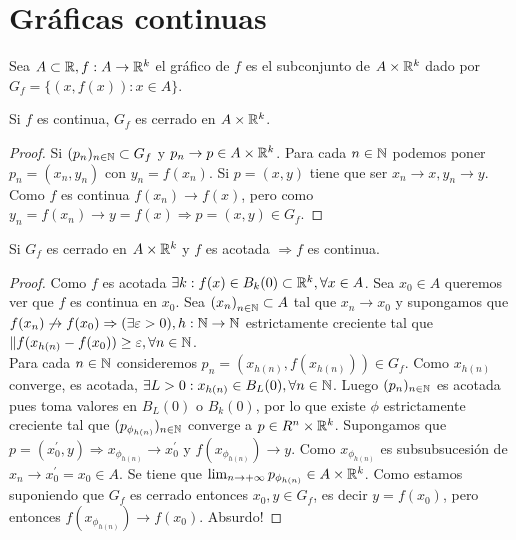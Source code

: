 \section{Gráficas continuas}

\begin{definition}
  Sea \(A \subset \mathbb{R}, f: A \to \mathbb{R}^k\) el gráfico de \(f\) es el subconjunto de \(A \times \mathbb{R}^k\) dado por \(G_f = \{ (x, f(x)) : x \in A \} \).
\end{definition}

\begin{prop}
  Si \(f\) es continua, \(G_f\) es cerrado en \(A \times \mathbb{R}^k\).
  \begin{proof}
    Si \((p_n)_{n \in \mathbb{N}} \subset G_f\) y \(p_n \to p \in A \times \mathbb{R}^k\). Para cada \(n \in \mathbb{N} \) podemos poner \(p_n = (x_n, y_n)\) con \(y_n = f(x_n)\). Si \(p = (x, y)\) tiene que ser \(x_n \to x, y_n \to y\). Como \(f\) es continua \(f(x_n) \to f(x)\), pero como \(y_n = f(x_n) \to y = f(x) \Rightarrow p = (x, y) \in G_f\).
  \end{proof}
\end{prop}

\begin{prop}
  Si \(G_f\) es cerrado en \(A \times \mathbb{R}^k\) y \(f\) es acotada \(\Rightarrow f\) es continua.
  \begin{proof}
    Como \(f\) es acotada \(\exists k : f(x) \in B_k(0) \subset \mathbb{R}^k, \forall x \in A\). Sea \(x_0 \in A\) queremos ver que \(f\) es continua en \(x_0\). Sea \({(x_n)}_{n \in \mathbb{N}} \subset A\) tal que \(x_n \to x_0\) y supongamos que \(f(x_n) \not \to f(x_0) \Rightarrow (\exists \varepsilon > 0), h: \mathbb{N} \to \mathbb{N} \) estrictamente creciente tal que \( \|f(x_{h(n)} - f(x_0)) \geq \varepsilon, \forall n \in \mathbb{N} \). \\
    Para cada \(n \in \mathbb{N} \) consideremos \(p_n = (x_{h(n)}, f(x_{h(n)})) \in G_f\). Como \(x_{h(n)} \) converge, es acotada, \(\exists L > 0 : x_{h(n)} \in B_L(0), \forall n \in \mathbb{N} \). Luego \((p_n)_{n \in \mathbb{N}} \) es acotada pues toma valores en \(B_L(0)\) o \(B_k(0)\), por lo que existe \(\phi \) estrictamente creciente tal que \((p_{\phi_{h(n)}})_{n \in \mathbb{N}} \) converge a \(p \in R^n \times \mathbb{R}^k\).
    Supongamos que \(p = (x_0^{\prime}, y) \Rightarrow x_{\phi_{h(n)}} \to x_0^{\prime} \) y \(f(x_{\phi_{h(n)}}) \to y\). Como \(x_{\phi_{h(n)}} \) es subsubsucesión de \(x_n \to x_0^{\prime} = x_0 \in A\). Se tiene que \(\lim_{n \to +\infty} p_{\phi_{h(n)}} \in A \times \mathbb{R}^k\). Como estamos suponiendo que \(G_f\) es cerrado entonces \(x_0, y \in G_f\), es decir \(y = f(x_0)\), pero entonces \(f(x_{\phi_{h(n)}}) \to f(x_0)\). Absurdo!
  \end{proof}
\end{prop}


